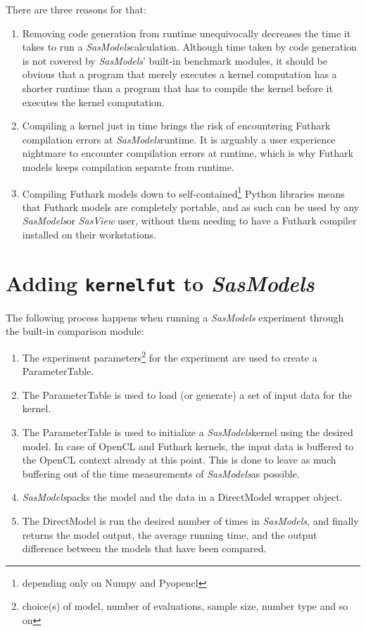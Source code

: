 \documentclass[11pt]{article}
\newcommand{\sasmodels}{\textit{SasModels}}
\newcommand{\sasview}{\textit{SasView}}
\begin{document}
There are three reasons for that:
\begin{enumerate}
  \item Removing code generation from runtime unequivocally decreases the time
  it takes to run a \sasmodels calculation. Although time taken by code 
  generation is not covered by \sasmodels' built-in benchmark modules, it should
  be obvious that a program that merely executes a kernel computation has a 
  shorter runtime than a program that has to compile the kernel before it
  executes the kernel computation.
  
  \item Compiling a kernel just in time brings the risk of encountering 
  Futhark compilation errors at \sasmodels runtime. 
  It is arguably a user experience nightmare to encounter compilation errors at 
  runtime, which is why Futhark models keeps compilation separate from runtime.
  
  \item Compiling Futhark models down to self-contained\footnote{depending only 
  on Numpy and Pyopencl} Python libraries means that Futhark models are 
  completely portable, and as such can be used by any \sasmodels or \sasview 
  user, without them needing to have a Futhark compiler installed on their 
  workstations.
\end{enumerate}

\section{Adding \texttt{kernelfut} to \sasmodels}
The following process happens when running a \sasmodels{} experiment through the
built-in comparison module:
\begin{enumerate}
  \item The experiment parameters\footnote{choice(s) of model, number of 
  evaluations, sample size, number type and so on} for the experiment are used
  to create a ParameterTable.
  
  \item The ParameterTable is used to load (or generate) a set of input data for
   the kernel.

  \item The ParameterTable is used to initialize a \sasmodels kernel using the
  desired model. In case of OpenCL and Futhark kernels, the input data is 
  buffered to the OpenCL context already at this point. This is done to leave
  as much buffering out of the time measurements of \sasmodels as possible.
  
  \item \sasmodels packs the model and the data in a DirectModel wrapper object.

  \item The DirectModel is run the desired number of times in \sasmodels,
  and finally returns the model output, the average running time, and the
  output difference between the models that have been compared. 
\end{enumerate}
\end{document}
